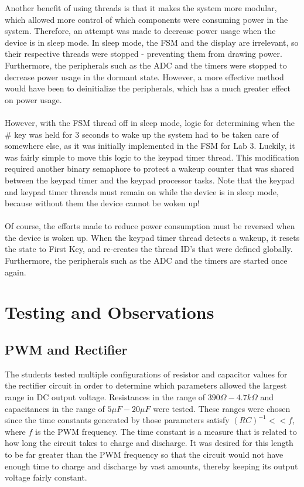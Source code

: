 \documentclass[12pt]{report}
\begin{document}
Another benefit of using threads is that it makes the system more modular, which allowed more
control of which components were consuming power in the system. Therefore, an attempt was made to
decrease power usage when the device is in sleep mode. In sleep mode, the FSM and the display are
irrelevant, so their respective threads were stopped - preventing them from drawing power.
Furthermore, the peripherals such as the ADC and the timers were stopped to decrease power usage in
the dormant state. However, a more effective method would have been to deinitialize the peripherals,
which has a much greater effect on power usage.\\\\
However, with the FSM thread off in sleep mode, logic for determining when the \# key was held for 3
seconds to wake up the system had to be taken care of somewhere else, as it was initially
implemented in the FSM for Lab 3. Luckily, it was fairly simple to move this logic to the keypad
timer thread. This modification required another binary semaphore to protect a wakeup counter that
was shared between the keypad timer and the keypad processor tasks. Note that the keypad and keypad
timer threads must remain on while the device is in
sleep mode, because without them the device cannot be woken up!\\\\
Of course, the efforts made to reduce power consumption must be reversed when the device is woken
up. When the keypad timer thread detects a wakeup, it resets the state to First Key, and re-creates
the thread ID's that were defined globally. Furthermore, the peripherals such as the ADC and the
timers are started once again.


\section{Testing and Observations}

\subsection{PWM and Rectifier}\label{testpwm}

The students tested multiple configurations of resistor and capacitor values for the rectifier
circuit in order to determine which parameters allowed the largest range in DC output voltage.
Resistances in the range of $390\Omega-4.7k\Omega$ and capacitances in the range of $5\mu F-20\mu F$
were tested. These ranges were chosen since the time constants generated by those parameters satisfy
$(RC)^{-1}<<f$, where $f$ is the PWM frequency. The time constant is a measure that is related to
how long the circuit takes to charge and discharge. It was desired for this length to be far greater
than the PWM frequency so that the circuit would not have enough time to charge and discharge by
vast amounts, thereby keeping its output voltage fairly constant.\\\\
\end{document}
